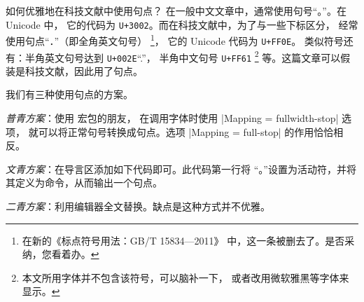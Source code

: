 \begin{myQA}{如何优雅地在科技文献中使用句点？}
在一般中文文章中，通常使用句号“{。}”。在 Unicode 中，
它的代码为 \texttt{U+3002}。而在科技文献中，为了与一些下标区分，
经常使用句点“．”（即全角英文句号）
\footnote{在新的《标点符号用法：GB/T 15834—2011》
	中，这一条被删去了。是否采纳，您看着办。}，
它的 Unicode 代码为 \texttt{U+FF0E}。
类似符号还有：半角英文句号达到 \texttt{U+002E}“.”，
半角中文句号 \texttt{U+FF61}
\footnote{本文所用字体并不包含该符号，可以脑补一下，
	或者改用微软雅黑等字体来显示。}%
等。这篇文章可以假装是科技文献，因此用了句点。

我们有三种使用句点的方案。

\emph{普青方案}：使用   宏包的朋友，
在调用字体时使用
\code|Mapping = fullwidth-stop|  选项，
就可以将正常句号转换成句点。选项 \code|Mapping = full-stop|
的作用恰恰相反。

\emph{文青方案}：在导言区添加如下代码即可。此代码第一行将
“{。}”设置为活动符，并将其定义为命令，从而输出一个句点。
 

\emph{二青方案}：利用编辑器全文替换。缺点是这种方式并不优雅。

\end{myQA}

